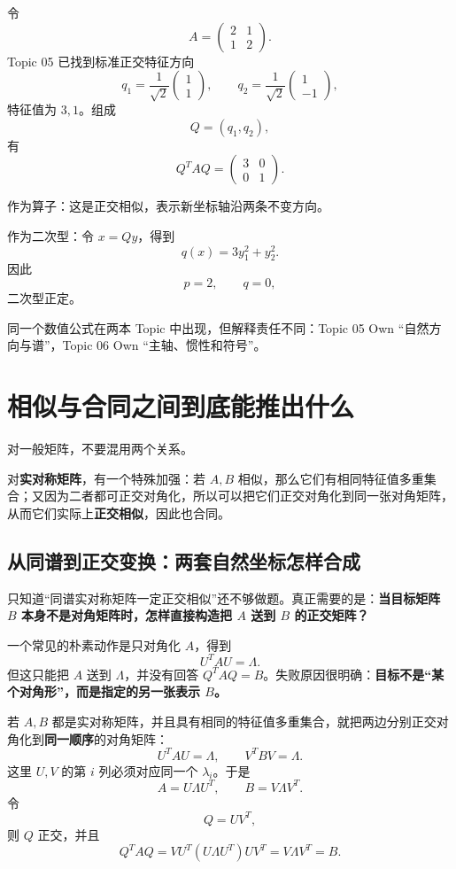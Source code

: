 \documentclass[11pt,a4paper]{ctexart}
\newcommand{\kw}[1]{\textbf{\color{deep}#1}}
\begin{document}
令
\[
A=\begin{pmatrix}2&1\\1&2\end{pmatrix}.
\]
Topic 05 已找到标准正交特征方向
\[
q_1=\frac1{\sqrt2}\begin{pmatrix}1\\1\end{pmatrix},
\qquad
q_2=\frac1{\sqrt2}\begin{pmatrix}1\\-1\end{pmatrix},
\]
特征值为 $3,1$。组成
\[
Q=(q_1,q_2),
\]
有
\[
Q^TAQ=\begin{pmatrix}3&0\\0&1\end{pmatrix}.
\]

作为算子：这是正交相似，表示新坐标轴沿两条不变方向。

作为二次型：令 $x=Qy$，得到
\[
q(x)=3y_1^2+y_2^2.
\]
因此
\[
p=2,\qquad q=0,
\]
二次型正定。

同一个数值公式在两本 Topic 中出现，但解释责任不同：Topic 05 Own “自然方向与谱”，Topic 06 Own “主轴、惯性和符号”。

\section{相似与合同之间到底能推出什么}

对一般矩阵，不要混用两个关系。

对\kw{实对称矩阵}，有一个特殊加强：若 $A,B$ 相似，那么它们有相同特征值多重集合；又因为二者都可正交对角化，所以可以把它们正交对角化到同一张对角矩阵，从而它们实际上\kw{正交相似}，因此也合同。

\subsection{从同谱到正交变换：两套自然坐标怎样合成}

只知道“同谱实对称矩阵一定正交相似”还不够做题。真正需要的是：\kw{当目标矩阵 $B$ 本身不是对角矩阵时，怎样直接构造把 $A$ 送到 $B$ 的正交矩阵？}

一个常见的朴素动作是只对角化 $A$，得到
\[
U^TAU=\Lambda.
\]
但这只能把 $A$ 送到 $\Lambda$，并没有回答 $Q^TAQ=B$。失败原因很明确：\kw{目标不是“某个对角形”，而是指定的另一张表示 $B$。}

若 $A,B$ 都是实对称矩阵，并且具有相同的特征值多重集合，就把两边分别正交对角化到\kw{同一顺序}的对角矩阵：
\[
U^TAU=\Lambda,
\qquad
V^TBV=\Lambda.
\]
这里 $U,V$ 的第 $i$ 列必须对应同一个 $\lambda_i$。于是
\[
A=U\Lambda U^T,
\qquad
B=V\Lambda V^T.
\]
令
\[
\boxed{Q=UV^T,}
\]
则 $Q$ 正交，并且
\[
\boxed{
Q^TAQ
=VU^T(U\Lambda U^T)UV^T
=V\Lambda V^T
=B.
}
\]
\end{document}
